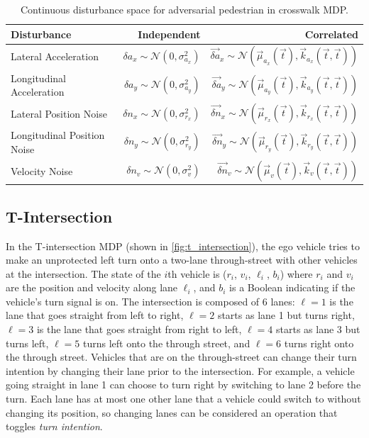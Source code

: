 \begin{table}
    \centering
    \caption{Continuous disturbance space for adversarial pedestrian in crosswalk MDP.}
    \label{tab:adversarial_ped_disturbance_space}
    \begin{tabular}{@{}lrr@{}} 
        \toprule
        \textbf{Disturbance} & \textbf{Independent} & \textbf{Correlated} \\
        \midrule
        Lateral Acceleration &  $\delta a_x \sim \mathcal{N}(0, \sigma_{a_x}^2)$ &  $\vec{\delta a}_x \sim \mathcal{N}(\vec{\mu}_{a_x}(\vec{t}), \vec{k}_{a_x}(\vec{t}, \vec{t}))$ \\
        Longitudinal Acceleration &  $ \delta a_y \sim \mathcal{N}(0, \sigma_{a_y}^2)$ &  $\vec{\delta a}_y \sim \mathcal{N}(\vec{\mu}_{a_y}(\vec{t}), \vec{k}_{a_y}(\vec{t}, \vec{t}))$ \\
        Lateral Position Noise &  $\delta n_x \sim \mathcal{N}(0, \sigma_{r_x}^2)$ &  $\vec{\delta n}_x \sim \mathcal{N}(\vec{\mu}_{r_x}(\vec{t}), \vec{k}_{r_x}(\vec{t}, \vec{t}))$ \\
        Longitudinal Position Noise &  $\delta n_y \sim \mathcal{N}(0, \sigma_{r_y}^2)$ &  $\vec{\delta n}_y \sim \mathcal{N}(\vec{\mu}_{r_y}(\vec{t}), \vec{k}_{r_y}(\vec{t}, \vec{t}))$ \\
        Velocity Noise &  $\delta n_v \sim \mathcal{N}(0, \sigma_{v}^2)$ &  $\vec{\delta n}_{v} \sim \mathcal{N}(\vec{\mu}_{v}(\vec{t}), \vec{k}_{v}(\vec{t}, \vec{t}))$ \\
        \bottomrule
    \end{tabular}
\end{table}
 



\subsection{T-Intersection}

In the T-intersection MDP (shown in \cref{fig:t_intersection}), the ego vehicle tries to make an unprotected left turn onto a two-lane through-street with other vehicles at the intersection. The state of the $i$th vehicle is ($r_i$, $v_i$, $\ell_i$, $b_i$) where $r_i$ and $v_i$ are the position and velocity along lane $\ell_i$, and $b_i$ is a Boolean indicating if the vehicle's turn signal is on. The intersection is composed of \num{6} lanes: $\ell = 1$ is the lane that goes straight from left to right, $\ell = 2$ starts as lane \num{1} but turns right, $\ell = 3$ is the lane that goes straight from right to left, $\ell = 4$ starts as lane \num{3} but turns left, $\ell = 5$ turns left onto the through street, and $\ell = 6$ turns right onto the through street. Vehicles that are on the through-street can change their turn intention by changing their lane prior to the intersection. For example, a vehicle going straight in lane \num{1} can choose to turn right by switching to lane \num{2} before the turn. Each lane has at most one other lane that a vehicle could switch to without changing its position, so changing lanes can be considered an operation that toggles \emph{turn intention}.

